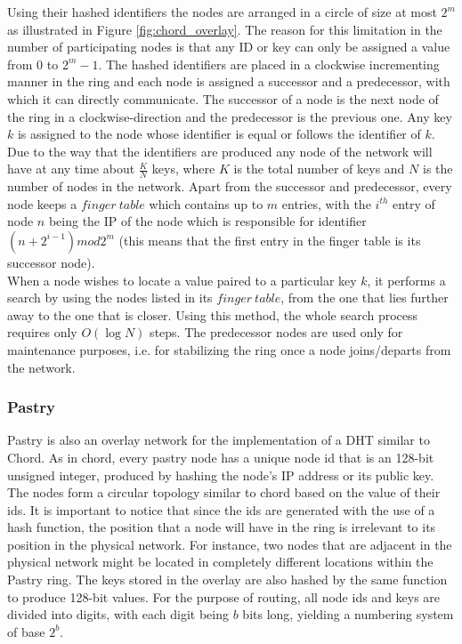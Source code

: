 \documentclass[a4paper,11pt,twoside]{report}
\begin{document}
Using their hashed identifiers the nodes are arranged in a circle of size at most $2^m$ as illustrated in Figure \ref{fig:chord_overlay}. The reason for this limitation in the number of participating nodes is that any ID or key can only be assigned a value from 0 to $2^m-1$. The hashed identifiers are placed in a clockwise incrementing manner in the ring and each node is assigned a successor and a predecessor, with which it can directly communicate. The successor of a node is the next node of the ring in a clockwise-direction and the predecessor is the previous one.
Any key $k$ is assigned to the node whose identifier is equal or follows the identifier of $k$. Due to the way that the identifiers are produced any node of the network will have at any time about $\frac{K}{N}$ keys, where $K$ is the total number of keys and $N$ is the number of nodes in the network. Apart from the successor and predecessor, every node keeps a $finger\ table$ which contains up to $m$ entries, with the $i^{th}$ entry of node $n$ being the IP of the node which is responsible for identifier $(n+2^{i-1}) mod 2^m$ (this means that the first entry in the finger table is its successor node).\\

When a node wishes to locate a value paired to a particular key $k$, it performs a search by using the nodes listed in its $finger\ table$, from the one that lies further away to the one that is closer. Using this method, the whole search process requires only $O(\log N)$ steps. The predecessor nodes are used only for maintenance purposes, i.e. for stabilizing the ring once a node joins/departs from the network.


 
\subsubsection*{Pastry}

Pastry \cite{Rowstron:2001:PSD:646591.697650} is also an overlay network for the implementation of a DHT similar to Chord. As in chord, every pastry node has a unique node id that is an 128-bit unsigned integer, produced by hashing the node's IP address or its public key. The nodes form a circular topology similar to chord based on the value of their ids. It is important to notice that since the ids are generated with the use of a hash function, the position that a node will have in the ring is irrelevant to its position in the physical network. For instance, two nodes that are adjacent in the physical network might be located in completely different locations within the Pastry ring. The keys stored in the overlay are also hashed by the same function to produce 128-bit values. For the purpose of routing, all node ids and keys are divided into digits, with each digit being $b$ bits long, yielding a numbering system of base $2^b$.\\
\end{document}
